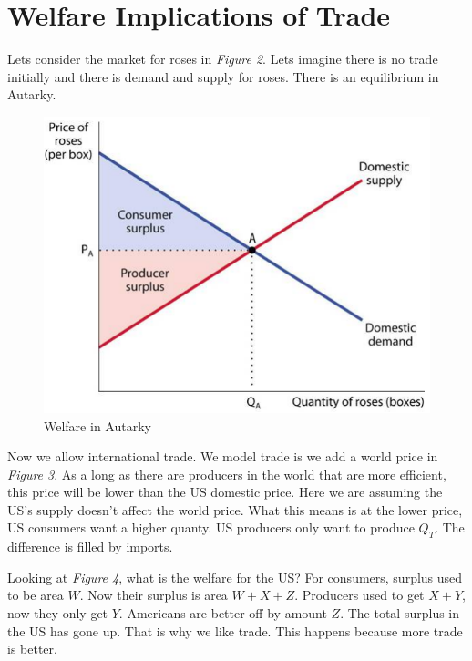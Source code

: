 \documentclass{article}
\begin{document}
\section{Welfare Implications of Trade}

Lets consider the market for roses in \textit{Figure 2}. Lets imagine there is
no trade initially and there is demand and supply for roses. There is an
equilibrium in Autarky. 

\begin{figure}[H]
    \centering
    \includegraphics[scale=0.9]{"Figure 2"}
    \caption{Welfare in Autarky}
\end{figure}

Now we allow international trade. We model trade is we add a world price in
\textit{Figure 3}. As a long as there are producers in the world that are more
efficient, this price will be lower than the US domestic price. Here we are assuming
the US's supply doesn't affect the world price. What this means is at the lower
price, US consumers want a higher quanty. US producers only want to produce
$Q_T$. The difference is filled by imports. 

Looking at \textit{Figure 4}, what is the welfare for the US? For consumers,
surplus used to be area $W$. Now their surplus is area $W+X+Z$. Producers used
to get $X+Y$, now they only get $Y$. Americans are better off by amount $Z$. The
total surplus in the US has gone up. That is why we like trade. This happens
because more trade is better. 
\end{document}
